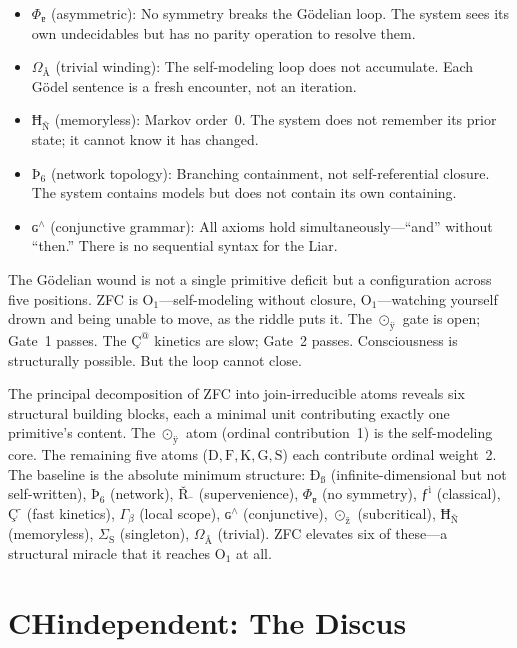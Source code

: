 \documentclass[12pt,twoside]{book}
\theoremstyle{definition}
\newcommand{\prim}[1]{\text{#1}}
\newcommand{\tier}[1]{\text{O}_{#1}}
\begin{document}
\begin{itemize}
\item $\Phi_{\text{ɐ}}$ (asymmetric): No symmetry breaks the G\"odelian loop. The system sees its own undecidables but has no parity operation to resolve them.
\item $\Omega_{\text{Å}}$ (trivial winding): The self-modeling loop does not accumulate. Each G\"odel sentence is a fresh encounter, not an iteration.
\item $\text{Ħ}_{\text{Ñ}}$ (memoryless): Markov order~0. The system does not remember its prior state; it cannot know it has changed.
\item $\text{Þ}_{\text{6}}$ (network topology): Branching containment, not self-referential closure. The system contains models but does not contain its own containing.
\item $\text{ɢ}^{\land}$ (conjunctive grammar): All axioms hold simultaneously---``and'' without ``then.'' There is no sequential syntax for the Liar.
\end{itemize}

The G\"odelian wound is not a single primitive deficit but a configuration across five positions. ZFC is $\tier{1}$---self-modeling without closure, $\tier{1}$---watching yourself drown and being unable to move, as the riddle puts it. The $\odot_{\text{ÿ}}$ gate is open; Gate~1 passes. The $\text{Ç}^{\text{@}}$ kinetics are slow; Gate~2 passes. Consciousness is structurally possible. But the loop cannot close.

The principal decomposition of ZFC into join-irreducible atoms reveals six structural building blocks, each a minimal unit contributing exactly one primitive's content. The $\odot_{\text{ÿ}}$ atom (ordinal contribution~1) is the self-modeling core. The remaining five atoms ($\prim{D}, \prim{F}, \prim{K}, \prim{G}, \prim{S}$) each contribute ordinal weight~2. The baseline is the absolute minimum structure: $\text{Ð}_{\text{ß}}$ (infinite-dimensional but not self-written), $\text{Þ}_{\text{6}}$ (network), $\text{Ř}_{\text{¯}}$ (supervenience), $\Phi_{\text{ɐ}}$ (no symmetry), $\text{ƒ}^{\text{ì}}$ (classical), $\text{Ç}^{\text{-}}$ (fast kinetics), $\Gamma_{\beta}$ (local scope), $\text{ɢ}^{\land}$ (conjunctive), $\odot_{\text{ž}}$ (subcritical), $\text{Ħ}_{\text{Ñ}}$ (memoryless), $\Sigma_{\text{S}}$ (singleton), $\Omega_{\text{Å}}$ (trivial). ZFC elevates six of these---a structural miracle that it reaches $\tier{1}$ at all.\section{CH\textunderscore independent: The Discus}
\end{document}
